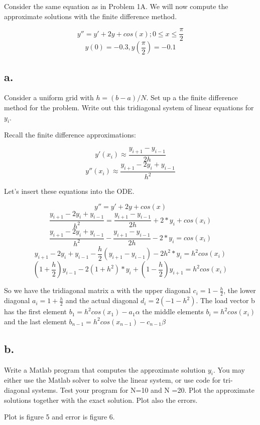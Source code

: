 \documentclass[]{article}
\begin{document}
Consider the same equation as in Problem 1A. We will now compute the
approximate solutions with the finite difference method.

\[y'' = y' + 2y + cos(x); 0 \leq x \leq \frac\pi2\]
\[y(0) = -0.3, y(\frac\pi2) = -0.1\]

\subsection{a.}\label{a.-1}

Consider a uniform grid with \(h = (b - a)/N\). Set up a the finite
difference method for the problem. Write out this tridiagonal system of
linear equations for \(y_i\).

Recall the finite difference approximations:

\[y'(x_i) \approx \frac{y_{i+1} - y_{i-1}}{2h}\]
\[y''(x_i) \approx \frac{y_{i+1}-2y_i + y_{i-1}}{h^2}\]

Let's insert these equations into the ODE.

\[y'' = y' + 2y + cos(x)\]
\[\frac{y_{i+1}-2y_i + y_{i-1}}{h^2} = \frac{y_{i+1} - y_{i-1}}{2h} + 2 * y_i + cos(x_i)\]
\[\frac{y_{i+1}-2y_i + y_{i-1}}{h^2} - \frac{y_{i+1} - y_{i-1}}{2h} - 2 * y_i = cos(x_i)\]
\[y_{i+1}-2y_i + y_{i-1} - \frac{h}2(y_{i+1} - y_{i-1}) - 2h^2 * y_i = h^2cos(x_i)\]
\[ (1+\frac{h}2)y_{i-1} - 2(1+h^2) * y_i + (1-\frac{h}2)y_{i+1} = h^2cos(x_i)\]

So we have the tridiagonal matrix a with the upper diagonal
\(c_i = 1-\frac{h}2\), the lower diagonal \(a_i = 1+\frac{h}2\) and the
actual diagonal \(d_i = 2(-1 -h^2)\). The load vector b has the first
element \(b_1 = h^2cos(x_1) - a_1\alpha\) the middle elements
\(b_i = h^2cos(x_i)\) and the last element
\(b_{n-1} = h^2cos(x_{n-1})-c_{n-1}\beta\)

\subsection{b.}\label{b.-1}

Write a Matlab program that computes the approximate solution \(y_i\).
You may either use the Matlab solver to solve the linear system, or use
code for tri-diagonal systems. Test your program for N=10 and N =20.
Plot the approximate solutions together with the exact solution. Plot
also the errors.

Plot is figure 5 and error is figure 6.
\end{document}
